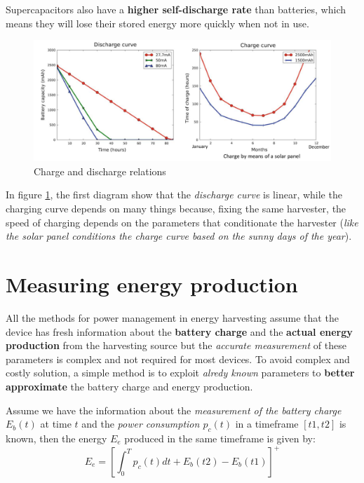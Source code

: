 \documentclass[10pt,a4paper]{report}
\theoremstyle{definition}
\begin{document}
Supercapacitors also have a \textbf{higher self-discharge rate} than batteries, which means they will lose their stored energy more quickly when not in use.
\begin{figure}[h]
	\centering\includegraphics[scale=0.30]{images/Pasted image 20230506085756.png}
	\caption{Charge and discharge relations}
	\label{charge-discharge}

\end{figure}


In figure \ref{charge-discharge}, the first diagram show that the \textit{discharge curve} is linear, while the charging curve depends on many things because, fixing the same harvester, the speed of charging depends on the parameters that conditionate the harvester (\textit{like the solar panel conditions the charge curve based on the sunny days of the year}).
\section{Measuring energy production}\label{sec:measuring-energy-production}
All the methods for power management in energy harvesting assume that the device has fresh information about the \textbf{battery charge} and the \textbf{actual energy production} from the harvesting source but the \textit{accurate measurement} of these parameters is complex and not required for most devices.
To avoid complex and costly solution, a simple method is to exploit \textit{alredy known} parameters to \textbf{better approximate} the battery charge and energy production.

Assume we have the information about the \textit{measurement of the battery charge $E_{b}(t)$} at time $t$ and the \textit{power consumption $p_{c}(t)$} in a timeframe $[t1,t2]$ is known, then the energy $E_{e}$ produced in the same timeframe is given by:
\begin{equation}
	E_{e} = \left[\int_{0}^{T} p_{c}(t)dt+E_{b}(t2)-E_{b}(t1)\right]^{+}
\end{equation}
\end{document}
